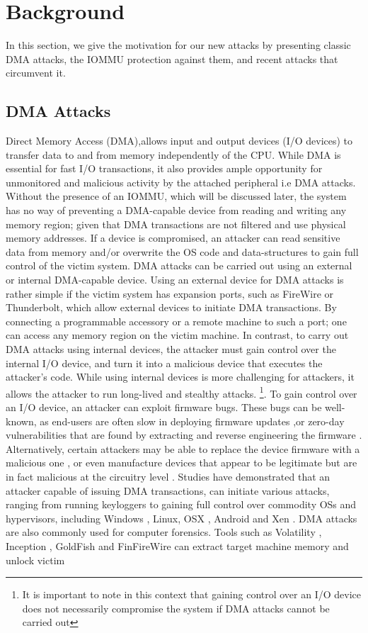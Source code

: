 \section{Background}
In this section, we give the motivation for our new attacks by presenting classic DMA attacks, the IOMMU protection against them, and recent attacks that circumvent it.
\subsection{DMA Attacks}
Direct Memory Access (DMA),allows input and output devices (I/O devices) to transfer data to and from memory \cite{oC54} independently of the CPU. While DMA is essential for fast I/O transactions, it also provides ample opportunity for unmonitored and malicious activity by the attached peripheral i.e DMA attacks. Without the presence of an IOMMU, which will be discussed later, the system has no way of preventing a DMA-capable device from reading and writing any memory region; given that DMA transactions are not filtered and use physical memory addresses. If a device is compromised, an attacker can read sensitive data from memory and/or overwrite the OS code and data-structures to gain full control of the victim system. DMA attacks can be carried out using an external or internal DMA-capable device. Using an external device for DMA attacks is rather simple if the victim system has expansion ports, such as FireWire or Thunderbolt, which allow external devices to initiate DMA transactions. By connecting a programmable accessory or a remote machine to such a port; one can access  any memory region on the victim machine\cite{Dor04, Vol, MM, thunder}. In contrast, to carry out DMA attacks using internal devices, the attacker must gain control over the internal I/O device, and turn it into a malicious device that executes the attacker’s code. While using internal devices is more challenging for attackers, it allows the attacker to run long-lived and stealthy attacks. \footnote{It is important to note in this context that gaining control over an I/O device does not necessarily compromise the system if DMA attacks cannot be carried out}. To gain control over an I/O device, an attacker can exploit firmware bugs. These bugs can be well-known, as end-users are often slow in deploying firmware updates \cite{DPVL10},or zero-day vulnerabilities that are found by extracting and reverse engineering the firmware \cite{Ben17b}. Alternatively, certain attackers may be able to replace the device firmware with a malicious one \cite{ZKB13, NL14}, or even manufacture devices that appear to be legitimate but are in fact malicious at the circuitry level \cite{YHD16, thunder}. Studies have demonstrated that an attacker capable of issuing DMA transactions, can initiate various attacks, ranging from running keyloggers \cite{LKV13, SB12} to gaining full control over commodity OSs and hypervisors, including Windows \cite{AD10,thunder}, Linux, OSX \cite{Fri16, thunder}, Android \cite{Ben17b} and Xen \cite{Woj08}. DMA attacks are also commonly used for computer forensics. Tools such as Volatility \cite{Vol}, Inception \cite{MM}, GoldFish \cite{GA10} and FinFireWire \cite{Fin14} can extract target machine memory and unlock victim 